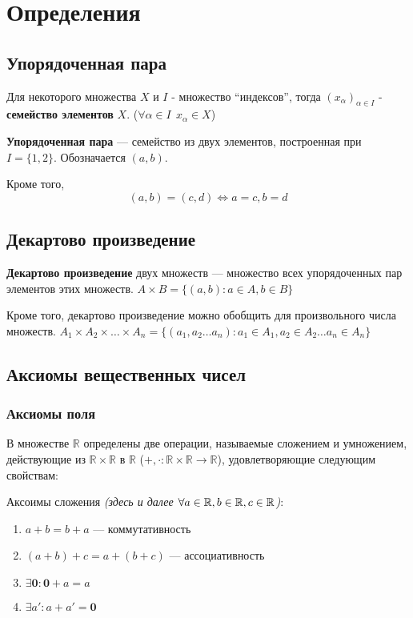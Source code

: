 

\usepackage{bm}
\usepackage{xcolor}
\usepackage{sectsty}

\allsectionsfont{\raggedright}
\subsectionfont{\fontsize{14}{15}\selectfont}

\cfoot{}
\rfoot{}

\setlength\parindent{0pt}


\section{Определения}
\subsection{Упорядоченная пара}
Для некоторого множества $X$ и $I$ - множество ``индексов'', тогда $(x_\alpha)_{\alpha\in I}$ - \textbf{семейство элементов} $X$. ($\forall \alpha\in I \ \ x_\alpha \in X$)

\textbf{Упорядоченная пара} --- семейство из двух элементов, построенная при $I=\{1, 2\}$. Обозначается $(a, b)$.

Кроме того, $$(a,b)=(c,d)\Leftrightarrow a = c, b = d$$

\subsection{Декартово произведение}
\textbf{Декартово произведение} двух множеств --- множество всех упорядоченных пар элементов этих множеств. $A\times B=\{(a,b): a\in A, b\in B\}$

Кроме того, декартово произведение можно обобщить для произвольного числа множеств. $A_1\times A_2\times\ldots\times A_n = \{(a_1,a_2\ldots a_n) : a_1\in A_1, a_2\in A_2\ldots a_n\in A_n\}$

\subsection{Аксиомы вещественных чисел}
\subsubsection{Аксиомы поля}
В множестве $\mathbb{R}$ определены две операции, называемые сложением и умножением, действующие из $\mathbb{R}\times\mathbb{R}$ в $\mathbb{R}$ ($+,\cdot:\mathbb{R}\times\mathbb{R} \rightarrow \mathbb{R}$), удовлетворяющие следующим свойствам:

Аксоимы сложения \textit{(здесь и далее $\forall a\in \operatorname*{\mathbb{R}}, b\in \operatorname*{\mathbb{R}}, c\in \operatorname*{\mathbb{R}}$)}:
\begin{enumerate}
    \itemsep0em
    \item $a+b=b+a$ --- коммутативность
    \item $(a+b)+c=a+(b+c)$ --- ассоциативность
    \item $\exists \bm{0}: \bm0+a=a$
    \item $\exists a': a+a'=\bm 0$
\end{enumerate}

